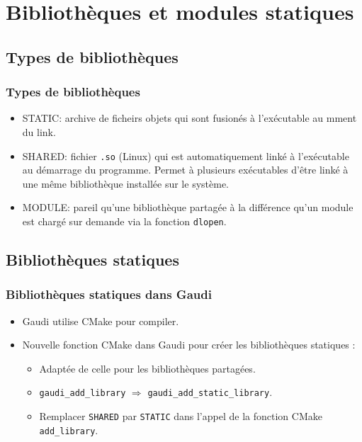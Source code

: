 \documentclass{beamer}
\begin{document}
\section{Bibliothèques et modules statiques}

\begin{frame}
    \tableofcontents[currentsection]
\end{frame}

\subsection{Types de bibliothèques}

\begin{frame}[fragile]
    \frametitle{Types de bibliothèques}

    \begin{itemize}
        \item STATIC: archive de ficheirs objets qui sont fusionés à l'exécutable au mment du link.
        \item SHARED: fichier \verb'.so' (Linux) qui est automatiquement linké à l'exécutable au démarrage du programme.
              Permet à plusieurs exécutables d'être linké à une même bibliothèque installée sur le système.
        \item MODULE: pareil qu'une bibliothèque partagée à la différence qu'un module est chargé sur demande via la fonction \verb'dlopen'.
    \end{itemize}
\end{frame}

\subsection{Bibliothèques statiques}

\begin{frame}[fragile]
    \frametitle{Bibliothèques statiques dans Gaudi}

    \begin{itemize}
        \item Gaudi utilise CMake pour compiler.
        \item Nouvelle fonction CMake dans Gaudi pour créer les bibliothèques statiques :
              \begin{itemize}
                  \item Adaptée de celle pour les bibliothèques partagées.
                  \item \verb'gaudi_add_library' $\Rightarrow$ \verb'gaudi_add_static_library'.
                  \item Remplacer \verb'SHARED' par \verb'STATIC' dans l'appel de la fonction CMake \verb'add_library'.
              \end{itemize}
    \end{itemize}
\end{frame}
\end{document}
